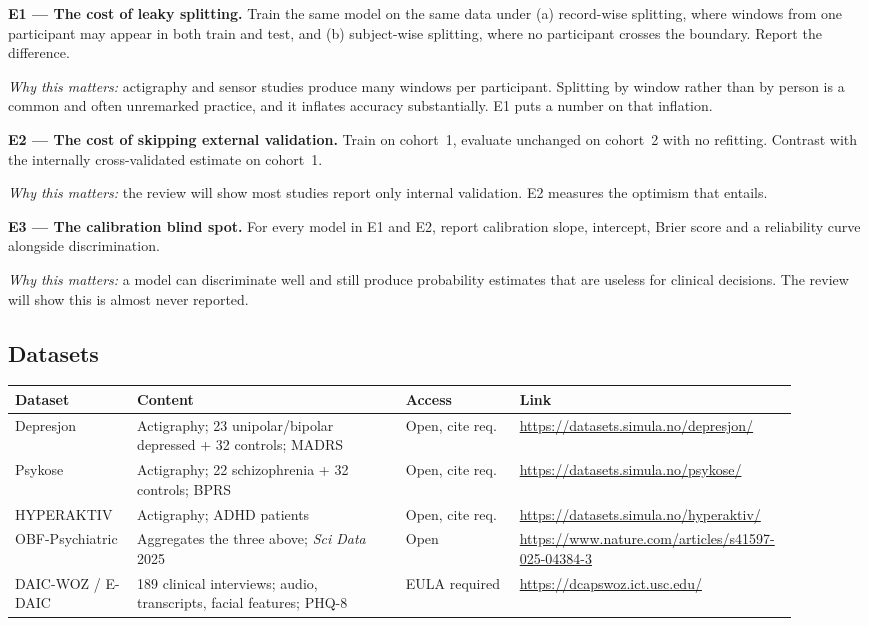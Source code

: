 \documentclass[11pt,a4paper]{article}
\begin{document}
\begin{panel}
\textbf{E1 --- The cost of leaky splitting.}
Train the same model on the same data under (a) record-wise splitting, where
windows from one participant may appear in both train and test, and
(b) subject-wise splitting, where no participant crosses the boundary.
Report the difference.

\smallskip
\emph{Why this matters:} actigraphy and sensor studies produce many windows
per participant. Splitting by window rather than by person is a common and
often unremarked practice, and it inflates accuracy substantially. E1 puts a
number on that inflation.

\medskip
\textbf{E2 --- The cost of skipping external validation.}
Train on cohort~1, evaluate unchanged on cohort~2 with no refitting.
Contrast with the internally cross-validated estimate on cohort~1.

\smallskip
\emph{Why this matters:} the review will show most studies report only
internal validation. E2 measures the optimism that entails.

\medskip
\textbf{E3 --- The calibration blind spot.}
For every model in E1 and E2, report calibration slope, intercept, Brier
score and a reliability curve alongside discrimination.

\smallskip
\emph{Why this matters:} a model can discriminate well and still produce
probability estimates that are useless for clinical decisions. The review
will show this is almost never reported.
\end{panel}

\subsection{Datasets}

\begin{center}
\footnotesize
\setlength{\tabcolsep}{5pt}
\renewcommand{\arraystretch}{1.3}
\begin{tabular}{@{}p{0.15\linewidth}p{0.33\linewidth}p{0.14\linewidth}p{0.29\linewidth}@{}}
\toprule
\textbf{Dataset} & \textbf{Content} & \textbf{Access} & \textbf{Link}\\
\midrule
Depresjon & Actigraphy; 23 unipolar/bipolar depressed + 32 controls; MADRS &
  Open, cite req. & \url{https://datasets.simula.no/depresjon/}\\
Psykose & Actigraphy; 22 schizophrenia + 32 controls; BPRS &
  Open, cite req. & \url{https://datasets.simula.no/psykose/}\\
HYPERAKTIV & Actigraphy; ADHD patients &
  Open, cite req. & \url{https://datasets.simula.no/hyperaktiv/}\\
OBF-Psychiatric & Aggregates the three above; \emph{Sci Data} 2025 &
  Open & \url{https://www.nature.com/articles/s41597-025-04384-3}\\
DAIC-WOZ / E-DAIC & 189 clinical interviews; audio, transcripts, facial
  features; PHQ-8 & EULA required &
  \url{https://dcapswoz.ict.usc.edu/}\\
\bottomrule
\end{tabular}
\end{center}
\end{document}
